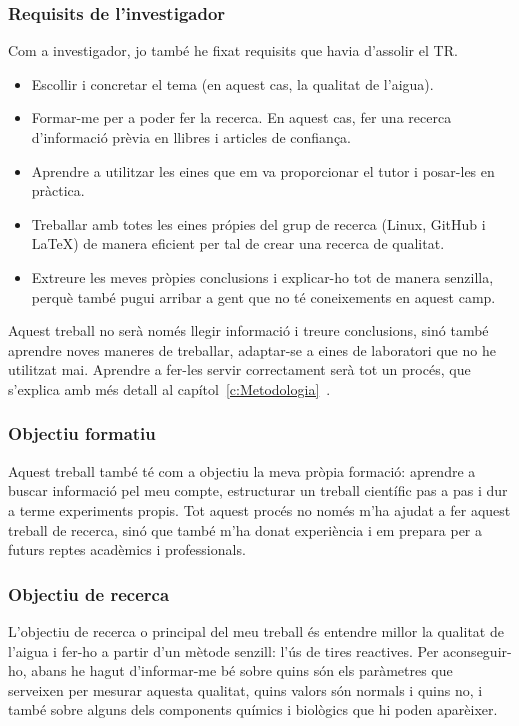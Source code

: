 \subsubsection*{Requisits de l'investigador}
Com a investigador, jo també he fixat requisits que havia d'assolir el TR.
\begin{itemize}
    \item Escollir i concretar el tema (en aquest cas, la qualitat de l’aigua).
    \item Formar-me per a poder fer la recerca. En aquest cas, fer una recerca d'informació prèvia en llibres i articles de confiança.
    \item Aprendre a utilitzar les eines que em va proporcionar el tutor i posar-les en pràctica.
    \item Treballar amb totes les eines própies del grup de recerca (Linux, GitHub i LaTeX) de manera eficient per tal de crear una recerca de qualitat.
    \item Extreure les meves pròpies conclusions i explicar-ho tot de manera senzilla, perquè també pugui arribar a gent que no té coneixements en aquest camp.
\end{itemize}

Aquest treball no serà només llegir informació i treure conclusions, sinó també aprendre noves maneres de treballar, adaptar-se a eines de laboratori que no he utilitzat mai. Aprendre a fer-les servir correctament serà tot un procés, que s'explica amb més detall al capítol~\ref{c:Metodologia}~.

\subsubsection{Objectiu formatiu}
Aquest treball també té com a objectiu la meva pròpia formació: aprendre a buscar informació pel meu compte, estructurar un treball científic pas a pas i dur a terme experiments propis. Tot aquest procés no només m’ha ajudat a fer aquest treball de recerca, sinó que també m’ha donat experiència i em prepara per a futurs reptes acadèmics i professionals.

\subsubsection{Objectiu de recerca}
L’objectiu de recerca o principal del meu treball és entendre millor la qualitat de l’aigua i fer-ho a partir d’un mètode senzill: l’ús de tires reactives. Per aconseguir-ho, abans he hagut d’informar-me bé sobre quins són els paràmetres que serveixen per mesurar aquesta qualitat, quins valors són normals i quins no, i també sobre alguns dels components químics i biològics que hi poden aparèixer.




